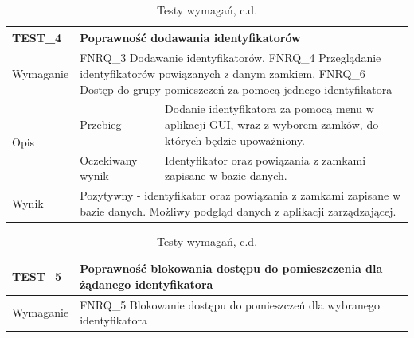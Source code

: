         \begin{table}[h!]
            \ContinuedFloat
            \caption{Testy wymagań, c.d.}
            \begin{subtable}[c]{\textwidth}
                \centering
                    \begin{tabular}{p{2cm}|p{}|p{}}
                    TEST\_4               & \multicolumn{2}{l}{\textbf{Poprawność dodawania identyfikatorów}}                                                            \\ \hline
                    Wymaganie             & \multicolumn{2}{p{12cm}}{FNRQ\_3 Dodawanie identyfikatorów, FNRQ\_4 Przeglądanie identyfikatorów powiązanych z danym zamkiem, FNRQ\_6 Dostęp do grupy pomieszczeń za pomocą jednego identyfikatora }                                                                                    \\ \hline
                    \multirow{2}{*}{Opis} & Przebieg           & Dodanie identyfikatora za pomocą menu w aplikacji GUI, wraz z wyborem zamków, do których będzie upoważniony.  \\ \cline{2-3}
                                         & Oczekiwany wynik   & Identyfikator oraz powiązania z zamkami zapisane w bazie danych.                                                 \\ \hline
                    Wynik                 & \multicolumn{2}{p{12cm}}{Pozytywny - identyfikator oraz powiązania z zamkami zapisane w bazie danych. Możliwy podgląd danych z aplikacji zarządzającej.} \\
                    \end{tabular}%
                \label{tbl:test4}
                \vspace{10mm}
            \end{subtable}
        \quad%
            \begin{subtable}[c]{\textwidth}
                \centering
                    \begin{tabular}{p{2cm}|p{}|p{}}
                    \hline
                    TEST\_5               & \multicolumn{2}{p{12cm}}{\textbf{Poprawność blokowania dostępu do pomieszczenia dla żądanego identyfikatora}}                                                            \\ \hline
                    Wymaganie             & \multicolumn{2}{p{12cm}}{FNRQ\_5 Blokowanie dostępu do pomieszczeń dla wybranego identyfikatora }                                                                                    \\ \hline

\end{tabular}
\end{subtable}
\end{table}
